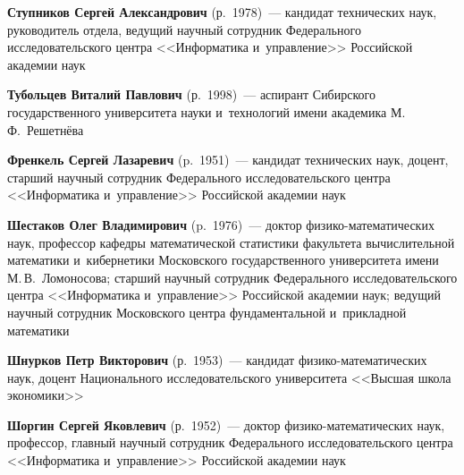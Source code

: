 \begin{multicols}{2}
{}

 \smallskip

\noindent
\textbf{Ступников Сергей Александрович} (р.\ 1978)~--- 
кандидат технических наук, руководитель отдела, ведущий научный сотрудник Федерального исследовательского цент\-ра <<Информатика и~управ\-ле\-ние>>
 Российской академии наук
 
 \smallskip
 
 \noindent
\textbf{Тубольцев Виталий Павлович} (р.\ 1998)~--- аспирант Сибирского государственного университета науки и~технологий имени академика М.\,Ф.~Решетнёва

 \smallskip

 \noindent
\textbf{Френкель Сергей Лазаревич} (p.\ 1951)~--- 
кандидат технических наук, доцент, старший научный сотрудник Федерального исследовательского цент\-ра <<Информатика и~управ\-ле\-ние>> Российской академии наук


 \smallskip


\noindent
\textbf{Шестаков Олег Владимирович} (p.\ 1976)~--- доктор фи\-зи\-ко-ма\-те\-ма\-ти\-че\-ских наук, 
профессор ка\-фед\-ры математической ста\-ти\-сти\-ки факультета вы\-чис\-ли\-тель\-ной математики и~кибернетики Московского государственного университета 
имени М.\,В.~Ломоносова; старший научный сотрудник Федерального исследовательского цент\-ра <<Информатика и~управ\-ле\-ние>>
 Российской академии наук; ведущий научный сотрудник Московского центра фундаментальной и~при\-клад\-ной математики
 
  \smallskip
 
 \noindent
\textbf{Шнурков Петр Викторович} (р.\ 1953)~--- кандидат фи\-зи\-ко-ма\-те\-ма\-ти\-че\-ских наук, 
доцент Национального исследовательского университета <<Высшая школа экономики>>

 \smallskip

\noindent
\textbf{Шоргин Сергей Яковлевич} (р.\ 1952)~--- доктор фи\-зи\-ко-ма\-те\-ма\-ти\-че\-ских наук, профессор, 
главный научный сотрудник Федерального исследовательского центра <<Информатика и~управ\-ление>> Российской академии наук






\def\leftkol{ОБ АВТОРАХ}

\def\rightkol{ОБ АВТОРАХ}


 \label{end\stat}



\end{multicols}

\def\leftkol{ОБ АВТОРАХ}
\def\rightkol{ОБ АВТОРАХ}

\newpage